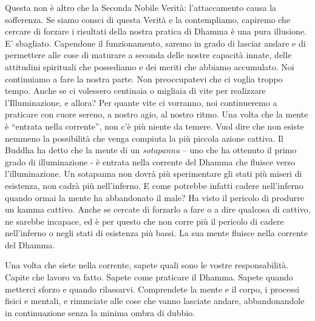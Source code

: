 Questa non è altro che la Seconda Nobile Verità: l'attaccamento causa la
sofferenza. Se siamo consci di questa Verità e la contempliamo, capiremo
che cercare di forzare i risultati della nostra pratica di Dhamma è una
pura illusione. E' sbagliato. Capendone il funzionamento, saremo in
grado di lasciar andare e di permettere alle cose di maturare a seconda
delle nostre capacità innate, delle attitudini spirituali che possediamo
e dei meriti che abbiamo accumulato. Noi continuiamo a fare la nostra
parte. Non preoccupatevi che ci voglia troppo tempo. Anche se ci
volessero centinaia o migliaia di vite per realizzare l'Illuminazione, e
allora? Per quante vite ci vorranno, noi continueremo a praticare con
cuore sereno, a nostro agio, al nostro ritmo. Una volta che la mente è
``entrata nella corrente'', non c'è più niente da temere. Vuol dire che
non esiste nemmeno la possibilità che venga compiuta la più piccola
azione cattiva. Il Buddha ha detto che la mente di
un \emph{sotapanna} -- uno che ha ottenuto il primo grado di
illuminazione - è entrata nella corrente del Dhamma che fluisce verso
l'illuminazione. Un sotapanna non dovrà più sperimentare gli stati più
miseri di esistenza, non cadrà più nell'inferno. E come potrebbe infatti
cadere nell'inferno quando ormai la mente ha abbandonato il male? Ha
visto il pericolo di produrre un kamma cattivo. Anche se cercate di
forzarlo a fare o a dire qualcosa di cattivo, ne sarebbe incapace, ed è
per questo che non corre più il pericolo di cadere nell'inferno o negli
stati di esistenza più bassi. La sua mente fluisce nella corrente del
Dhamma.

Una volta che siete nella corrente, sapete quali sono le vostre
responsabilità. Capite che lavoro va fatto. Sapete come praticare il
Dhamma. Sapete quando metterci sforzo e quando rilassarvi. Comprendete
la mente e il corpo, i processi fisici e mentali, e rinunciate alle cose
che vanno lasciate andare, abbandonandole in continuazione senza la
minima ombra di dubbio.


